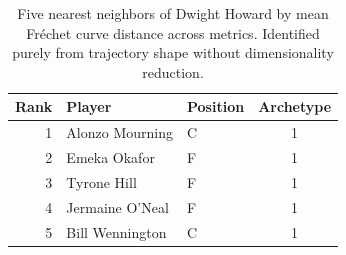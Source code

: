 \begin{table}[htbp]
  \centering\small
  \begin{tabular}{rllc}
    \toprule
    Rank & Player & Position & Archetype \\
    \midrule
    1 & Alonzo Mourning & C & 1 \\
    2 & Emeka Okafor & F & 1 \\
    3 & Tyrone Hill & F & 1 \\
    4 & Jermaine O'Neal & F & 1 \\
    5 & Bill Wennington & C & 1 \\
    \bottomrule
  \end{tabular}
  \caption{Five nearest neighbors of Dwight Howard by mean Fr\'{e}chet curve distance across metrics. Identified purely from trajectory shape without dimensionality reduction.}
  \label{tab:Dwight_Howard_frechet_curve_neighbors}
\end{table}

